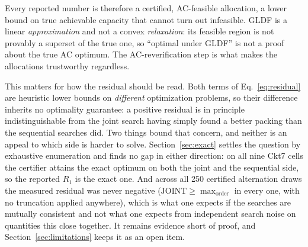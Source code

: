 \documentclass[review,authoryear,12pt]{elsarticle}
\begin{document}
Every reported number is therefore a certified, AC-feasible allocation, a
lower bound on true achievable capacity that cannot turn out infeasible.
GLDF is a linear \emph{approximation} and not a convex
\emph{relaxation}: its feasible region is not provably a superset of the true
one, so ``optimal under GLDF'' is not a proof about the true AC optimum. The
AC-reverification step is what makes the allocations trustworthy regardless.

This matters for how the residual should be read. Both terms of
Eq.~\eqref{eq:residual} are heuristic lower bounds on \emph{different}
optimization problems, so their difference inherits no optimality guarantee:
a positive residual is in principle indistinguishable from the joint search
having simply found a better packing than the sequential searches did. Two
things bound that concern, and neither is an appeal to which side is harder to
solve. Section~\ref{sec:exact} settles the question by exhaustive enumeration
and finds no gap in either direction: on all nine Ckt7
cells the certifier attains the exact optimum on both the joint and the
sequential side, so the reported $R_{1}$ is the exact one.
And across
all 250 certified alternation draws the measured residual was never negative
($\mathrm{JOINT} \ge \max_{\text{order}}$ in every one, with no truncation
applied anywhere), which is what one expects if the searches are
mutually consistent and not what one expects from independent search noise
on quantities this close together. It remains evidence short of proof, and
Section~\ref{sec:limitations} keeps it as an open item.
\end{document}
